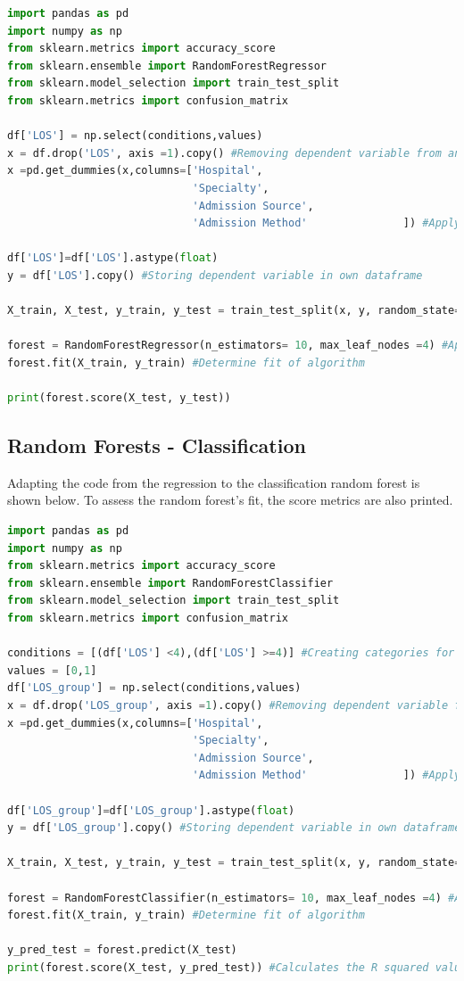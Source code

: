\documentclass[../thesis.tex]{subfiles}
\begin{document}
\begin{lstlisting}[language = python]
import pandas as pd
import numpy as np
from sklearn.metrics import accuracy_score
from sklearn.ensemble import RandomForestRegressor
from sklearn.model_selection import train_test_split
from sklearn.metrics import confusion_matrix

df['LOS'] = np.select(conditions,values)
x = df.drop('LOS', axis =1).copy() #Removing dependent variable from analysis
x =pd.get_dummies(x,columns=['Hospital',
                             'Specialty',
                             'Admission Source',
                             'Admission Method'               ]) #Applying one-hot encoding

df['LOS']=df['LOS'].astype(float)
y = df['LOS'].copy() #Storing dependent variable in own dataframe

X_train, X_test, y_train, y_test = train_test_split(x, y, random_state=0,test_size=0.2) #Creating training and testing data

forest = RandomForestRegressor(n_estimators= 10, max_leaf_nodes =4) #Applying the algorithm
forest.fit(X_train, y_train) #Determine fit of algorithm

print(forest.score(X_test, y_test))
\end{lstlisting}


\subsection{Random Forests - Classification}
Adapting the code from the regression to the classification random forest is shown below.  To assess the random forest's fit, the score metrics are also printed.
\begin{lstlisting}[language = python]
import pandas as pd
import numpy as np
from sklearn.metrics import accuracy_score
from sklearn.ensemble import RandomForestClassifier
from sklearn.model_selection import train_test_split
from sklearn.metrics import confusion_matrix

conditions = [(df['LOS'] <4),(df['LOS'] >=4)] #Creating categories for prediction
values = [0,1]
df['LOS_group'] = np.select(conditions,values)
x = df.drop('LOS_group', axis =1).copy() #Removing dependent variable from analysis
x =pd.get_dummies(x,columns=['Hospital',
                             'Specialty',
                             'Admission Source',
                             'Admission Method'               ]) #Applying one-hot encoding

df['LOS_group']=df['LOS_group'].astype(float)
y = df['LOS_group'].copy() #Storing dependent variable in own dataframe

X_train, X_test, y_train, y_test = train_test_split(x, y, random_state=0,test_size=0.2) #Creating training and testing data

forest = RandomForestClassifier(n_estimators= 10, max_leaf_nodes =4) #Applying the algorithm
forest.fit(X_train, y_train) #Determine fit of algorithm

y_pred_test = forest.predict(X_test)
print(forest.score(X_test, y_pred_test)) #Calculates the R squared value


\end{lstlisting}
\end{document}
